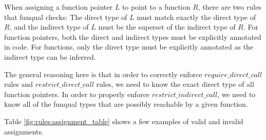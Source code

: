When assigning a function pointer $L$ to point to a function $R$, there are two rules that funqual checks:  The direct type of $L$ must match exactly the direct type of $R$, and the indirect type of $L$ must be the superset of the indirect type of $R$.  For function pointers, both the direct and indirect types must be explicitly annotated in code.  For functions, only the direct type must be explicitly annotated as the indirect type can be inferred.  

The general reasoning here is that in order to correctly enforce $require\_direct\_call$ rules and $restrict\_direct\_call$ rules, we need to know the exact direct type of all function pointers.  In order to properly enforce $restrict\_indirect\_call$, we need to know all of the funqual types that are possibly reachable by a given function. 

Table \ref{fig:rules:assignment_table} shows a few examples of valid and invalid assignments.  

